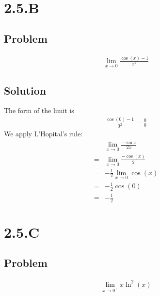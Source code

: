 \documentclass[12pt]{article}
\begin{document}
\section*{2.5.B}

\subsection*{Problem}
\begin{align*}
    \lim_{x \to 0} \frac{\cos(x) - 1}{x^2}
\end{align*}

\subsection*{Solution}
The form of the limit is
\begin{align*}
    \frac{\cos(0) - 1}{0^2} = \frac{0}{0}
\end{align*}
We apply L'Hopital's rule:
\begin{align*}
    & \lim_{x \to 0} \frac{-\sin{x}}{2x} \\
    =& \lim_{x \to 0} \frac{-\cos(x)}{2} \\
    =& -\frac{1}{2} \lim_{x \to 0} \cos(x) \\
    =& -\frac{1}{2} \cos(0) \\
    =& -\frac{1}{2}
\end{align*}




\section*{2.5.C}

\subsection*{Problem}
\begin{align*}
    \lim_{x \to 0^+} x \ln^2(x)
\end{align*}
\end{document}
